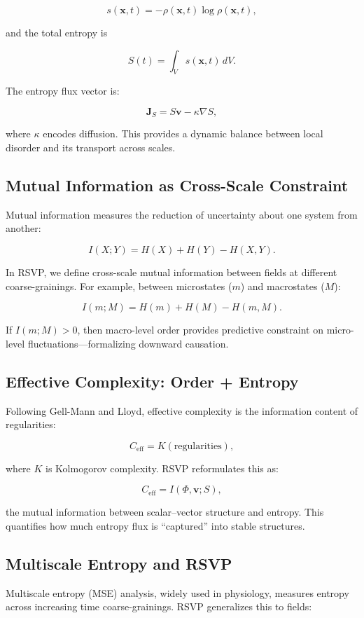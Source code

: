 \documentclass[12pt]{book}
\begin{document}
\[ s(\mathbf{x},t) = - \rho(\mathbf{x},t) \log \rho(\mathbf{x},t), \]

and the total entropy is

\[ S(t) = \int_V s(\mathbf{x},t)\, dV. \]

The entropy flux vector is:

\[ \mathbf{J}_S = S \mathbf{v} - \kappa \nabla S, \]

where \( \kappa \) encodes diffusion. This provides a dynamic balance between local disorder and its transport across scales.

\subsection{Mutual Information as Cross-Scale Constraint}
Mutual information measures the reduction of uncertainty about one system from another:

\[ I(X;Y) = H(X) + H(Y) - H(X,Y). \]

In RSVP, we define cross-scale mutual information between fields at different coarse-grainings. For example, between microstates (\( m \)) and macrostates (\( M \)):

\[ I(m; M) = H(m) + H(M) - H(m,M). \]

If \( I(m; M) > 0 \), then macro-level order provides predictive constraint on micro-level fluctuations—formalizing downward causation.

\subsection{Effective Complexity: Order + Entropy}
Following Gell-Mann and Lloyd, effective complexity is the information content of regularities:

\[ C_{\text{eff}} = K(\text{regularities}), \]

where \( K \) is Kolmogorov complexity. RSVP reformulates this as:

\[ C_{\text{eff}} = I(\Phi,\mathbf{v}; S), \]

the mutual information between scalar–vector structure and entropy. This quantifies how much entropy flux is “captured” into stable structures.

\subsection{Multiscale Entropy and RSVP}
Multiscale entropy (MSE) analysis, widely used in physiology, measures entropy across increasing time coarse-grainings. RSVP generalizes this to fields:
\end{document}
